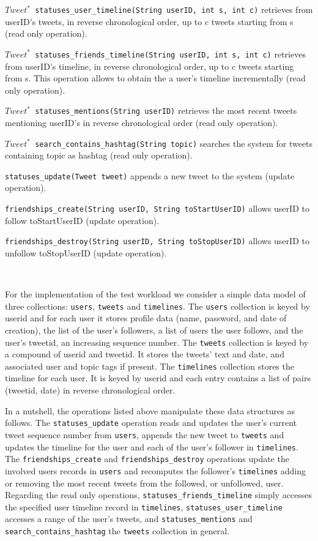 \documentclass[12pt]{article}
\begin{document}
{
\texttt{$Tweet^*$ statuses\_user\_timeline(String userID, int s, int c)} retrieves from userID's tweets, in reverse chronological order, up to c tweets starting from s (read only operation).

\texttt{$Tweet^*$
statuses\_friends\_timeline(String userID, int s, int c)} retrieves from
userID's timeline, in reverse chronological order, up to c tweets starting
from s. This operation allows to obtain the a user's timeline incrementally
(read only operation).

\texttt{$Tweet^*$ statuses\_mentions(String userID)} retrieves the most recent tweets mentioning userID's in reverse chronological order (read only operation).

\texttt{$Tweet^*$ search\_contains\_hashtag(String  topic)} searches the system for tweets containing topic as hashtag (read only operation).
	
\texttt{statuses\_update(Tweet tweet)} appends a new tweet to the system (update operation).
	
\texttt{friendships\_create(String userID, String toStartUserID)} allows userID to follow toStartUserID (update operation).
	
\texttt{friendships\_destroy(String userID, String toStopUserID)}
allows userID to unfollow toStopUserID (update operation).
	
}

~

For the implementation of the test workload we consider a simple data model of three collections: \verb+users+, \verb+tweets+ and \verb+timelines+. The \verb+users+ collection is keyed by userid and for each user it stores profile data (name, password, and date of creation), the list of the user's followers, a list of users the user follows, and the user's tweetid, an increasing sequence number. The \verb+tweets+ collection is keyed by a compound of userid and tweetid. It stores the tweets' text and date, and associated user and topic tags if present. The \verb+timelines+ collection stores the timeline for each user. It is keyed by userid and each entry contains a list of pairs (tweetid, date) in reverse chronological order.

In a nutshell, the operations listed above manipulate these data structures as
follows. The \verb+statuses_update+ operation reads and updates the user's
current tweet sequence number from \verb+users+, appends the new tweet to
\verb+tweets+ and updates the timeline for the user and each of the user's
follower in \verb+timelines+. The \verb+friendships_create+ and
\verb+friendships_destroy+ operations update the involved users records in
\verb+users+ and recomputes the follower's \verb+timelines+
adding or removing the most recent tweets from the followed, or unfollowed, user. Regarding the read only operations, \verb+statuses_friends_timeline+ simply accesses the specified user timeline record in \verb+timelines+, \verb+statuses_user_timeline+ accesses a range of the user's tweets, and \verb+statuses_mentions+ and \verb+search_contains_hashtag+ the \verb+tweets+ collection in general.
\end{document}
